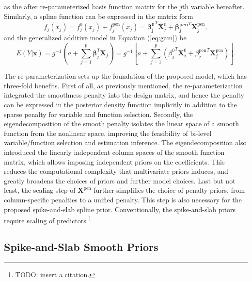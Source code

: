 \documentclass[AMA,STIX1COL,]{WileyNJD-v2}
\begin{document}
as the after re-parameterized basis function matrix for the \(j\)th
variable hereafter. Similarly, a spline function can be expressed in the
matrix form \[
f_j(x_j) = f_j^0(x_j) + f_j^\text{pen}(x_j) = \boldsymbol{\beta_j^0}^T \boldsymbol{X}_j^0 + \boldsymbol{\beta_j^\text{pen}}^T \boldsymbol{X}_j^\text{pen},
\] and the generalized additive model in Equation (\ref{eq:gam}) be
\begin{equation}\label{eq:gam-repa}
E(Y|\boldsymbol{x}) =  g^{-1}(a + \sum\limits^p_{j=1} \boldsymbol{\beta}_j^T \boldsymbol{X}_j) = g^{-1}\left[a + \sum\limits^p_{j=1} ({\beta_j^0}^T \boldsymbol{X}_j^0 + {\beta_j^\text{pen}}^T \boldsymbol{X}_j^\text{pen})\right].
\end{equation}

The re-parameterization sets up the foundation of the proposed model,
which has three-fold benefits. First of all, as previously mentioned,
the re-parameterization integrated the smoothness penalty into the
design matrix, and hence the penalty can be expressed in the posterior
density function implicitly in addition to the sparse penalty for
variable and function selection. Secondly, the eigendecomposition of the
smooth penalty isolates the linear space of a smooth function from the
nonlinear space, improving the feasibility of bi-level variable/function
selection and estimation inference. The eigendecomposition also
introduced the linearly independent column spaces of the smooth function
matrix, which allows imposing independent priors on the coefficients.
This reduces the computational complexity that multivariate priors
induces, and greatly broadens the choices of priors and further model
choices. Last but not least, the scaling step of
\(\boldsymbol{X}^\text{pen}\) further simplifies the choice of penalty
priors, from column-specific penalties to a unified penalty. This step
is also necessary for the proposed spike-and-slab spline prior.
Conventionally, the spike-and-slab priors require scaling of predictors
\footnote{TODO: insert a citation.}

\hypertarget{spike-and-slab-smooth-priors}{%
\subsection{Spike-and-Slab Smooth
Priors}\label{spike-and-slab-smooth-priors}}
\end{document}
